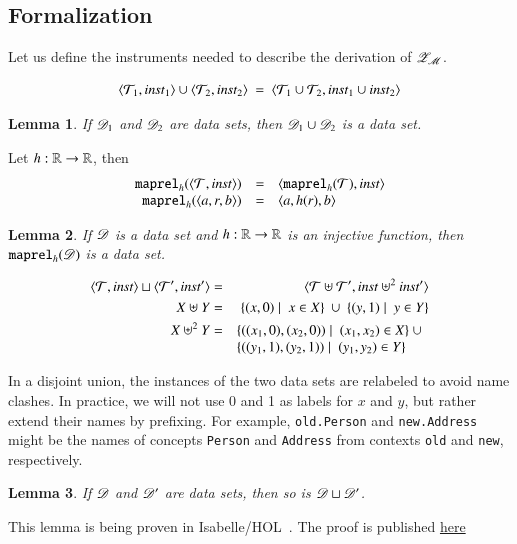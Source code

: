 \documentclass{elsarticle}
\newtheorem{lemma}{Lemma}
\begin{document}
\subsection{Formalization}
   Let us define the instruments needed to describe the derivation of $\mathscr{Z}_{\mathscr{M}}$.
\begin{definition}
\label{def:graph_union_wellTyped_if_parts_wellTyped}
    \[\pair{\triples_1}{\inst_1}\cup\pair{\triples_2}{\inst_2}\ =\ \pair{\triples_1\cup\triples_2}{\inst_1\cup\inst_2}\]
\end{definition}

\begin{lemma}
\label{lemma:graph_union_wellTyped_if_parts_wellTyped}
   If $\mathscr{D}_1$ and $\mathscr{D}_2$ are data sets, then $\mathscr{D}_1\cup\mathscr{D}_2$ is a data set.
\end{lemma}

\begin{definition}
\label{def:map_labels_preserves_wellTypedness}
   Let $h:\mathbb{R}\rightarrow\mathbb{R}$, then
   \[\begin{array}{rcl}
      {\tt maprel}_{h}({\langle{\mathcal{T}},{\mathbin{\text{\it inst\/}}}\rangle})&=&\langle{{\tt maprel}_{h}({\mathcal{T}})},{\mathbin{\text{\it inst\/}}}\rangle\\
      {\tt maprel}_{h}({\langle{a},{r},{b}\rangle})&=&\langle{a},{h(r)},{b}\rangle
   \end{array}\]
\end{definition}

\begin{lemma}
\label{lemma:map_labels_preserves_wellTypedness}
   If $\mathscr{D}$ is a data set and $h:\mathbb{R}\rightarrow\mathbb{R}$ is an injective function, then ${\tt maprel}_{h}({\mathscr{D}})$ is a data set.
\end{lemma}

\begin{definition}
\begin{eqnarray}
   \pair{\triples}{\inst}\sqcup\pair{\triples'}{\inst'}&=&\pair{\triples\uplus\triples'}{\inst\uplus^2\inst'}\\
      X\uplus Y&=&\{(x,0)\mid\ x\in X\}\ \cup\ \{(y,1)\mid\ y\in Y\}\\
      X\uplus^2 Y&=&\begin{array}[t]{@{}l}\{((x_1,0),(x_2,0))\mid\ (x_1,x_2)\in X\}\ \cup\\ \{((y_1,1),(y_2,1))\mid\ (y_1,y_2)\in Y\}\end{array}
\end{eqnarray}
\end{definition}
   In a disjoint union, the instances of the two data sets are relabeled to avoid name clashes.
   In practice, we will not use 0 and 1 as labels for $x$ and $y$, but rather extend their names by prefixing.
   For example, \texttt{old.Person} and \texttt{new.Address} might be the names of concepts \texttt{Person} and \texttt{Address} from contexts \texttt{old} and \texttt{new}, respectively.
\begin{lemma}
   If $\mathscr{D}$ and $\mathscr{D}'$ are data sets, then so is $\mathscr{D}\sqcup\mathscr{D}'$.
\end{lemma}
   This lemma is being proven in Isabelle/HOL~\cite{Isabelle}. The proof is published \href{location.domain}{here}
\end{document}
